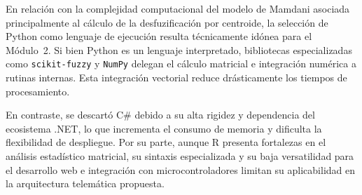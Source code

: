 En relación con la complejidad computacional del modelo de 
Mamdani asociada principalmente al cálculo de la desfuzificación 
por centroide, la selección de Python como lenguaje de ejecución
resulta técnicamente idónea para el Módulo~2. Si bien Python es 
un lenguaje interpretado, bibliotecas especializadas como
\texttt{scikit-fuzzy} y \texttt{NumPy} delegan el cálculo matricial 
e integración numérica a rutinas internas. 
Esta integración vectorial reduce drásticamente 
los tiempos de procesamiento.

En contraste, se descartó C\# debido a su alta rigidez y dependencia 
del ecosistema .NET, lo que incrementa el consumo de memoria y dificulta 
la flexibilidad de despliegue. Por su parte, aunque R presenta fortalezas 
en el análisis estadístico matricial, su sintaxis especializada y su baja 
versatilidad para el desarrollo web e integración con microcontroladores
limitan su aplicabilidad en la arquitectura telemática propuesta.





